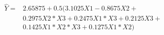 

\[
\begin{array}{ll} \hat{Y} = & 2.65875 + 0.5(3.1025X1 - 0.8675X2 + \\ & 0.2975X2*X3 + 0.2475X1*X3 + 0.2125X3 + \\ & 0.1425X1*X2*X3 + 0.1275X1*X2) \end{array}
\]



